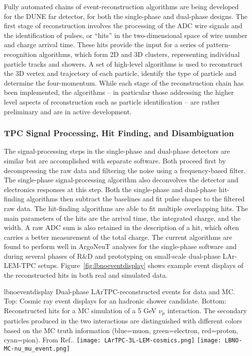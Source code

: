 Fully automated chains of event-reconstruction algorithms are being
developed for the DUNE far detector, for both the single-phase and
dual-phase designs.  The first stage of reconstruction involves the
processing of the ADC wire signals and the identification of pulses,
or ``hits'' in the two-dimensional space of wire number and charge
arrival time.  These hits provide the input for a series of
pattern-recognition algorithms, which form 2D and 3D clusters,
representing individual particle tracks and showers.  A set of
high-level algorithms is used to reconstruct the 3D vertex and
trajectory of each particle, identify the type of particle and
determine the four-momentum.  While each stage of the reconstruction
chain has been implemented, the algorithms -- in particular those
addressing the higher level aspects of reconstruction such as particle
identification -- are rather preliminary and are in active
development.



\subsubsection{TPC Signal Processing, Hit Finding, and Disambiguation}

The signal-processing steps in the single-phase and dual-phase
detectors are similar but are accomplished with separate software.
Both proceed first by decompressing the raw data and filtering the
noise using a frequency-based filter.  The single-phase
signal-processing algorithm also deconvolves the detector and
electronics responses at this step.  Both the single-phase and
dual-phase hit-finding algorithms then subtract the baselines and fit
pulse shapes to the filtered raw data.  The hit-finding algorithms are
able to fit multiple overlapping hits.  The main parameters of the
hits are the arrival time, the integrated charge, and the width.  A
raw ADC sum is also retained in the description of a hit, which often
carries a better measurement of the total charge.  The current
algorithms are found to perform well in ArgoNeuT
analyses\cite{Anderson:2012vc} for the single-phase software and
during several phases of R$\&$D and prototyping on small-scale
dual-phase LAr-LEM-TPC
setups\cite{Badertscher:2008rf,Badertscher:2012dq}.
Figure~\ref{fig:lbnoeventdisplay} shows example event displays of the
reconstructed hits in both real and simulated data.

\begin{cdrfigure}{lbnoeventdisplay}
{
Dual-phase LArTPC-reconstructed events for data and MC.  Top: Cosmic
ray event displays for an hadronic shower candidate.  Bottom:
Reconstructed hits for a MC simulation of a 5 GeV $\nu_{\mu}$
interaction.  The secondary particles produced in the two interactions
are distinguished with different colors based on the MC truth
information (blue=muon, green=electron, red=proton, cyan=pion).  From
Ref.\cite{Badertscher:2012dq}.  }
\texttt{[image: LArTPC-3L-LEM-cosmics.png]}
\texttt{[image: LBNO-MC-nu\_mu\_event.png]}
\end{cdrfigure}


